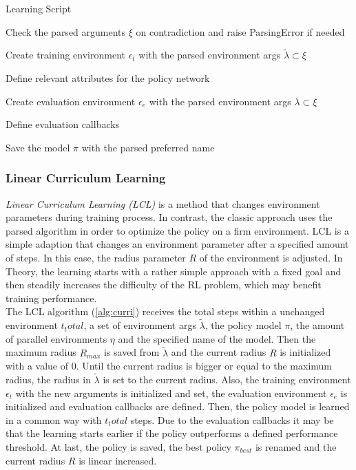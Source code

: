 \begin{algorithm}
	\caption{Learning Script}
	\label{alg:learn}
	
	Check the parsed arguments $\xi$ on contradiction and raise ParsingError if needed
	
	Create training environment $\epsilon_t$ with the parsed environment args $\tilde{\lambda} \subset \xi$
	
	Define relevant attributes for the policy network
	
	
	Create evaluation environment $\epsilon_e$ with the parsed environment args $\lambda \subset \xi$
	
	Define evaluation callbacks
	
	
	Save the model $\pi$ with the parsed preferred name
	
	
\end{algorithm}

\subsubsection{Linear Curriculum Learning}
\emph{Linear Curriculum Learning (LCL)} is a method that changes environment parameters during training process. In contrast, the classic approach uses the parsed algorithm in order to optimize the policy on a firm environment. LCL is a simple adaption that changes an environment parameter after a specified amount of steps. In this case, the radius parameter $R$ of the environment is adjusted. In Theory, the learning starts with a rather simple approach with a fixed goal and then steadily increases the difficulty of the RL problem, which may benefit training performance.\\
The LCL algorithm (\cref{alg:curri}) receives the total steps within a unchanged environment $t_total$, a set of environment args $\tilde{\lambda}$, the policy model $\pi$, the amount of parallel environments $\eta$ and the specified name of the model.
Then the maximum radius $R_{max}$ is saved from $\tilde{\lambda}$ and the current radius $R$ is initialized with a value of $0$.
Until the current radius is bigger or equal to the maximum radius, the radius in $\tilde{\lambda}$ is set to the current radius. Also, the training environment $\epsilon_t$ with the new arguments is initialized and set, the evaluation environment $\epsilon_e$ is initialized and evaluation callbacks are defined. Then, the policy model is learned in a common way with $t_total$ steps. Due to the evaluation callbacks it may be that the learning starts earlier if the policy outperforms a defined performance threshold. At last, the policy is saved, the best policy $\pi_{best}$ is renamed and the current radius $R$ is linear increased.

